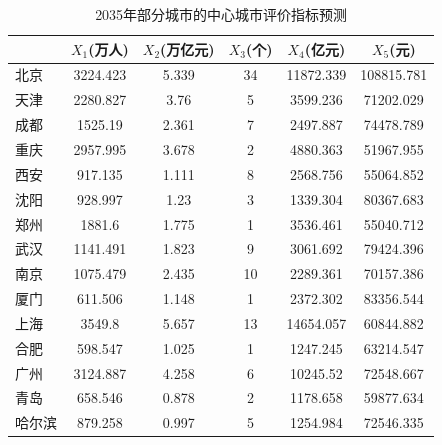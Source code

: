 \documentclass[openany,oneside]{ctexbook}
\begin{document}
\begin{table}[!htp]
   \centering
   \begin{tabular}{|l|c|c|c|c|c|}
      \hline
      &$X_1$(万人)&$X_2$(万亿元)&$X_3$(个)&$X_4$(亿元)&$X_5$(元)\\ \hline
      北京&3224.423&5.339&34&11872.339&108815.781 \\ \hline
      天津&2280.827&3.76&5&3599.236&71202.029 \\ \hline
      成都&1525.19&2.361&7&2497.887&74478.789 \\ \hline
      重庆&2957.995&3.678&2&4880.363&51967.955 \\ \hline
      西安&917.135&1.111&8&2568.756&55064.852 \\ \hline
      沈阳&928.997&1.23&3&1339.304&80367.683 \\ \hline
      郑州&1881.6&1.775&1&3536.461&55040.712 \\ \hline
      武汉&1141.491&1.823&9&3061.692&79424.396 \\ \hline
      南京&1075.479&2.435&10&2289.361&70157.386 \\ \hline
      厦门&611.506&1.148&1&2372.302&83356.544 \\ \hline
      上海&3549.8&5.657&13&14654.057&60844.882 \\ \hline
      合肥&598.547&1.025&1&1247.245&63214.547 \\ \hline
      广州&3124.887&4.258&6&10245.52&72548.667 \\ \hline
      青岛&658.546&0.878&2&1178.658&59877.634 \\ \hline
      哈尔滨&879.258&0.997&5&1254.984&72546.335 \\ \hline

      
   \end{tabular}
   \caption{2035年部分城市的中心城市评价指标预测}

\end{table}
\end{document}
